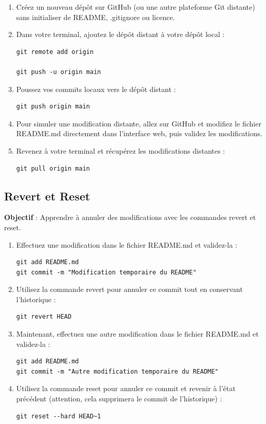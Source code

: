 \begin{enumerate}
	\item Créez un nouveau dépôt sur GitHub (ou une autre plateforme Git distante) sans initialiser de README, .gitignore ou licence.
	\item Dans votre terminal, ajoutez le dépôt distant à votre dépôt local :
	\begin{verbatim}
git remote add origin

git push -u origin main
	\end{verbatim}
	\newpage
	\item Poussez vos commits locaux vers le dépôt distant :
	\begin{verbatim}
git push origin main
	\end{verbatim}
	\item Pour simuler une modification distante, allez sur GitHub et modifiez le fichier README.md directement dans l'interface web, puis validez les modifications.
	\item Revenez à votre terminal et récupérez les modifications distantes :
	\begin{verbatim}
git pull origin main
	\end{verbatim}
\end{enumerate}

\subsection*{Revert et Reset}
{}
\noindent \textbf{Objectif} : Apprendre à annuler des modifications avec les commandes revert et reset.

\begin{enumerate}
	\item Effectuez une modification dans le fichier README.md et validez-la :
	\begin{verbatim}
git add README.md
git commit -m "Modification temporaire du README"
	\end{verbatim}
	\item Utilisez la commande revert pour annuler ce commit tout en conservant l'historique :
	\begin{verbatim}
git revert HEAD
	\end{verbatim}
	\item Maintenant, effectuez une autre modification dans le fichier README.md et validez-la :
	\begin{verbatim}
git add README.md
git commit -m "Autre modification temporaire du README"
	\end{verbatim}
	\item Utilisez la commande reset pour annuler ce commit et revenir à l'état précédent (attention, cela supprimera le commit de l'historique) :
	\begin{verbatim}
git reset --hard HEAD~1
	\end{verbatim}
\end{enumerate}

